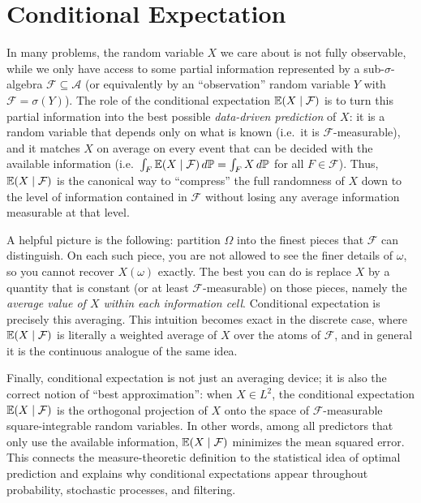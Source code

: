 
\chapter{Conditional Expectation}

In many problems, the random variable $X$ we care about is not fully observable, while we only have access to
some partial information represented by a sub-$\sigma$-algebra $\mathcal F\subseteq\mathcal A$
(or equivalently by an ``observation'' random variable $Y$ with $\mathcal F=\sigma(Y)$).
The role of the conditional expectation $\mathbb{E}(X\mid \mathcal F)$ is to turn this partial information into the
best possible \emph{data-driven prediction} of $X$: it is a random variable that depends only on what is known
(i.e.\ it is $\mathcal F$-measurable), and it matches $X$ on average on every event that can be decided with the
available information (i.e.\ $\int_F \mathbb{E}(X\mid\mathcal F)\,d\mathbb{P}=\int_F X\,d\mathbb{P}$ for all $F\in\mathcal F$).
Thus, $\mathbb{E}(X\mid\mathcal F)$ is the canonical way to ``compress'' the full randomness of $X$ down to the level of
information contained in $\mathcal F$ without losing any average information measurable at that level.

A helpful picture is the following: partition $\Omega$ into the finest pieces that $\mathcal F$ can distinguish.
On each such piece, you are not allowed to see the finer details of $\omega$, so you cannot recover $X(\omega)$ exactly.
The best you can do is replace $X$ by a quantity that is constant (or at least $\mathcal F$-measurable) on those pieces,
namely the \emph{average value of $X$ within each information cell}. Conditional expectation is precisely this averaging.
This intuition becomes exact in the discrete case, where $\mathbb{E}(X\mid\mathcal F)$ is literally a weighted average of $X$ over
the atoms of $\mathcal F$, and in general it is the continuous analogue of the same idea.

Finally, conditional expectation is not just an averaging device; it is also the correct notion of ``best approximation'':
when $X\in L^2$, the conditional expectation $\mathbb{E}(X\mid\mathcal F)$ is the orthogonal projection of $X$ onto the space of
$\mathcal F$-measurable square-integrable random variables. In other words, among all predictors that only use the available
information, $\mathbb{E}(X\mid\mathcal F)$ minimizes the mean squared error. This connects the measure-theoretic definition to the
statistical idea of optimal prediction and explains why conditional expectations appear throughout probability, stochastic
processes, and filtering.


